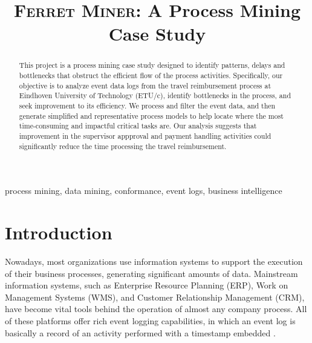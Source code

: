 \documentclass[conference]{IEEEtran}
\begin{document}
\title{\textsc{Ferret Miner}: A Process Mining Case Study}

\author{
\and
{}
\and
{}
\and
{}
}

\maketitle

\begin{abstract}
This project is a process mining case study designed to
identify patterns,
delays and bottlenecks that obstruct the efficient flow of the process
activities. Specifically, our
objective is to analyze event data logs from
the travel reimbursement process at Eindhoven University of Technology
(ETU/c), identify bottlenecks in the process, and
seek improvement to its efficiency.
We process and filter the event data, and then generate simplified and
representative process models to help locate where
the most time-consuming and impactful critical tasks are.
Our analysis suggests that
improvement in the supervisor appproval and payment handling activities 
could significantly
reduce the time processing the travel reimbursement.
\end{abstract}

\begin{IEEEkeywords}
process mining, data mining, conformance, event logs, business intelligence
\end{IEEEkeywords}

\section{Introduction}
\label{section-intro}


Nowadays, most organizations use information systems to support
the execution of their business processes, generating significant
amounts of data.
Mainstream information systems, such as Enterprise Resource
Planning (ERP), Work on Management Systems (WMS), and Customer
Relationship Management (CRM), have become vital tools behind the
operation of almost 
any company process\cite{Tuto2022}. All of these platforms
offer rich event logging capabilities, in which
an event log is
basically a record of an activity performed with a timestamp embedded
\cite{Proc2022}.
\end{document}
